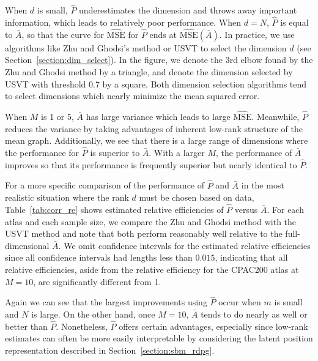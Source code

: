 \documentclass[10pt,letterpaper]{article}
\renewcommand{\hat}{\widehat}
\begin{document}
When $d$ is small, $\hat{P}$ underestimates the dimension and throws away important information, which leads to relatively poor performance. When $d=N$, $\hat{P}$ is equal to $\bar{A}$, so that the curve for $\hat{\mathrm{MSE}}$ for $\hat{P}$ ends at $\hat{\mathrm{MSE}}(\bar{A})$. 
In practice, we use algorithms like Zhu and Ghodsi's method or USVT to select the dimension $d$ (see Section~\ref{section:dim_select}). 
In the figure, we denote the 3rd elbow found by the Zhu and Ghodsi method by a triangle, and denote the dimension selected by USVT with threshold 0.7 by a square. 
Both dimension selection algorithms tend to select dimensions which nearly minimize the mean squared error.

When $M$ is 1 or 5, $\bar{A}$ has large variance which leads to large $\hat{\mathrm{MSE}}$. Meanwhile, $\hat{P}$ reduces the variance by taking advantages of inherent low-rank structure of the mean graph. Additionally, we see that there is a large range of dimensions where the performance for $\hat{P}$ is superior to $\bar{A}$. 
With a larger $M$, the performance of $\bar{A}$ improves so that its performance is frequently superior but nearly identical to $\hat{P}$.

For a more specific comparison of the performance of $\hat{P}$ and $\bar{A}$ in the most realistic situation where the rank $d$ must be chosen based on data, Table~\ref{tab:corr_re} shows estimated relative efficiencies of $\hat{P}$ versus $\bar{A}$.
For each atlas and each sample size, we compare the Zhu and Ghodsi method \citep{zhu2006automatic} with the USVT method \citep{chatterjee2015matrix} and note that both perform reasonably well relative to the full-dimensional $\bar{A}$.
We omit confidence intervals for the estimated relative efficiencies since all confidence intervals had lengths less than $0.015$, indicating that all relative efficiencies, aside from the relative efficiency for the CPAC200 atlas at $M=10$, are significantly different from 1.

Again we can see that the largest improvements using $\hat{P}$ occur when $m$ is small and $N$ is large. 
On the other hand, once $M=10$, $\bar{A}$ tends to do nearly as well or better than $\hat{P}$. 
Nonetheless, $\hat{P}$ offers certain advantages, especially since low-rank estimates can often be more easily interpretable by considering the latent position representation described in Section~\ref{section:sbm_rdpg}.
\end{document}

